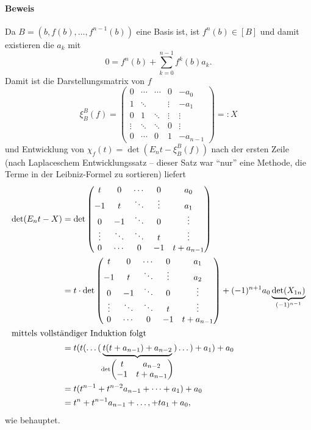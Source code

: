 \paragraph{Beweis}
	Da $ B= \left(b,f(b),\dots,f^{n-1}(b)\right) $ eine Basis ist, ist $ f^n(b)\in [B] $ und damit existieren die $ a_k $ mit
		\[ 0 = f^n(b) + \sum_{k=0}^{n-1}f^k(b)a_k. \]
	Damit ist die Darstellungsmatrix von $ f $
		\[ \xi_B^B(f) =
		\begin{pmatrix}
			0      & \cdots & \cdots & 0      & -a_0     \\
			1      & \ddots &        & \vdots & -a_1     \\
			0      & 1      & \ddots & \vdots & \vdots   \\
			\vdots & \ddots & \ddots & 0      & \vdots   \\
			0      & \cdots & 0      & 1      & -a_{n-1}
		\end{pmatrix} =: X
		\]
	und Entwicklung von $ \chi_f(t)=\det(E_nt-\xi_B^B(f)) $ nach der ersten Zeile (nach Laplaceschem Entwicklungssatz -- dieser Satz war "`nur"' eine Methode, die Terme in der Leibniz-Formel zu sortieren) liefert
	\begin{align*}
		\det(E_nt-X) &=\det 
			\begin{pmatrix}
				t      & 0      & \cdots & 0      & a_0       \\
				-1     & t      & \ddots & \vdots & a_1       \\
				0      & -1     & \ddots & 0	  & \vdots    \\
				\vdots & \ddots & \ddots & t      & \vdots    \\
				0      & \cdots & 0      & -1     & t+a_{n-1}
			\end{pmatrix}\\
		&= t\cdot\det
			\begin{pmatrix}
				t      & 0      & \cdots & 0      & a_1       \\
				-1     & t      & \ddots & \vdots & a_2       \\
				0      & -1     & \ddots & 0 	  & \vdots    \\
				\vdots & \ddots & \ddots & t      & \vdots    \\
				0      & \cdots & 0      & -1     & t+a_{n-1}
			\end{pmatrix}
		+ (-1)^{n+1} a_0 \underbrace{\det(X_{1n})}_{(-1)^{n-1}}\\
		\intertext{mittels vollständiger Induktion folgt}
		&= t (t(\dots(\underbrace{t(t+a_{n-1})+a_{n-2}}_{\det \begin{pmatrix}t&a_{n-2}\\-1&t+a_{n-1}\end{pmatrix}})\dots)+a_1)+a_0 \\
		&= t (t^{n-1}+t^{n-2}a_{n-1}+\dots+a_1)+a_0 \\
		&= t^n+t^{n-1}a_{n-1}+\dots,+ta_1+a_0,
	\end{align*}
	wie behauptet.
	
